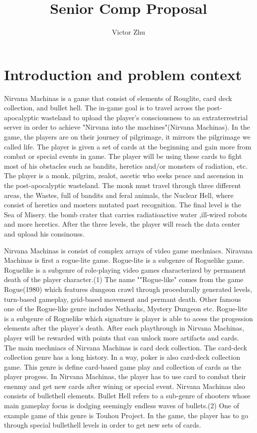 \documentclass[10pt,twocolumn]{article}
\title{Senior Comp Proposal}
\author{Victor Zhu}
\affiliation{Occidental College}
\begin{document}
\maketitle


\section{Introduction and problem context}

Nirvana Machinas is a game that consist of elements of Rouglite, card deck collection, and bullet hell. The in-game goal is to travel across the post-apocalyptic wasteland to upload the player’s consciousness to an extraterrestrial server in order to achieve "Nirvana into the machines"(Nirvana Machinas). In the game, the players are on their journey of pilgrimage, it mirrors the pilgrimage we called life. The player is given a set of cards at the beginning and gain more from combat or special events in game. The player will be using these cards to fight most of his obstacles such as bandits, heretics and/or monsters of radiation, etc. The player is a monk, pilgrim, zealot, ascetic who seeks peace and ascension in the post-apocalyptic wasteland. The monk must travel through three different areas, the Wastes, full of bandits and feral animals, the Nuclear Hell, where consist of heretics and mosters mutated past recognition. The final level is the Sea of Misery. the bomb crater that carries radiatioactive water ,ill-wired robots and more heretics. After the three levels, the player will reach the data center and upload his consinouss.

Nirvana Machinas is consist of complex arrays of video game mechniacs. Niravana Machinas is first a rogue-lite game. Rogue-lite is a subgenre of Roguelike game. Roguelike is a subgenre of role-playing video games characterized by permanent death of the player character.(1) The name ""Rogue-like" comes from the game Rogue(1980) which features dungeon crawl through procedurally generated levels, turn-based gameplay, grid-based movement and permant death. Other famous one of the Rogue-like genre includes Nethacks, Mystery Dungeon etc. Rogue-lite is a subgenre of Roguelike which signature is player is able to acess the progession elements after the player's death. After each playthrough in Nirvana Machinas, player will be rewarded with points that can unlock more artifacts and cards. The main mechniacs of Nirvana Machinas is card deck collection. The card-deck collection genre has a long history. In a way, poker is also card-deck collection game. This genre is define card-based game play and collection of cards as the player progess. In Nirvana Machinas, the player has to use card to combat their enenmy and get new cards after wining or special event. Nirvana Machinas also consists of bullethell elements. Bullet Hell refers to a sub-genre of shooters whose main gameplay focus is dodging seemingly endless waves of bullets.(2) One of example game of this genre is Touhou Project. In the game, the player has to go through special bullethell levels in order to get new sets of cards.
\end{document}
